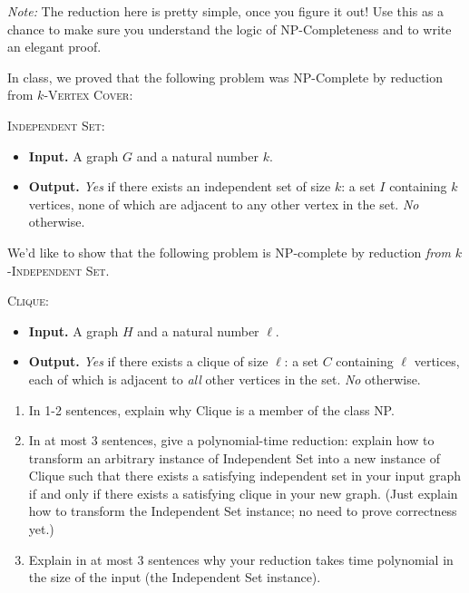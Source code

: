 \documentclass[12 pt, letterpaper]{hmcpset}
\newcommand{\NP}{\textsf{NP}}
\begin{document}
\begin{problem}
	\emph{Note:} The reduction here is pretty simple, once you figure it out! Use this as a chance to make sure you understand the logic of \NP-Completeness and to write an elegant proof.

In class, we proved that the following problem was \NP-Complete by reduction from $k$-\textsc{Vertex Cover}:

\textsc{Independent Set}:

\begin{itemize}
    \item \textbf{Input. } A graph $G$ and a natural number $k$. 
    \item \textbf{Output. } \emph{Yes} if there exists an independent set of size $k$: a set $I$ containing $k$ vertices, none of which are adjacent to any other vertex in the set. \emph{No} otherwise.
\end{itemize}

We'd like to show that the following problem is \NP-complete by reduction \emph{from} $k$-\textsc{Independent Set}.

\textsc{Clique}:

\begin{itemize}
    \item \textbf{Input. } A graph $H$ and a natural number $\ell$.
    \item \textbf{Output. } \emph{Yes} if there exists a clique of size $\ell$: a set $C$ containing $\ell$ vertices, each of which is adjacent to \emph{all} other vertices in the set. \emph{No} otherwise.
\end{itemize}

\begin{enumerate}
    \item In 1-2 sentences, explain why {\sc Clique} is a member of the class \NP.
    
    \item In at most 3 sentences, give a polynomial-time reduction: explain how to transform an arbitrary instance of {\sc Independent Set} into a new instance of {\sc Clique} such that there exists a satisfying independent set in your input graph if and only if there exists a satisfying clique in your new graph. (Just explain how to transform the {\sc Independent Set} instance; no need to prove correctness yet.)

    \item Explain in at most 3 sentences why your reduction takes time polynomial in the size of the input (the {\sc Independent Set} instance).


\end{enumerate}
\end{problem}
\end{document}
